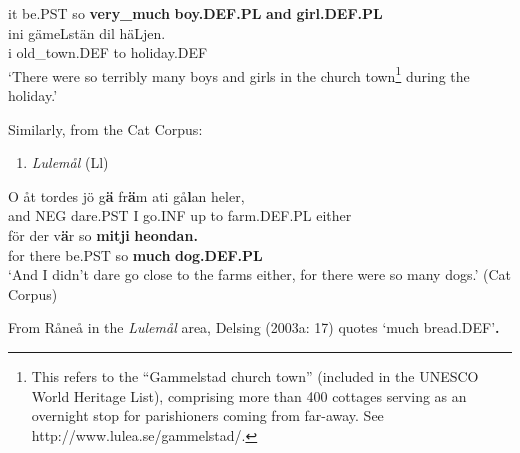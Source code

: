 it  be.PST  so  \textbf{very\_much} \textbf{boy.DEF.PL} \textbf{and} \textbf{girl.DEF.PL}\\ %


\ea\label{}
\gll ini  gämeLstän  dil  häLjen.\\


i  old\_town.DEF  to  holiday.DEF\\ %


‘There were so terribly many boys and girls in the church town\footnote{ This refers to the “Gammelstad church town” (included in the UNESCO World Heritage List), comprising more than 400 cottages serving as an overnight stop for parishioners coming from far-away. See http://www.lulea.se/gammelstad/.} during the holiday.’
\z

Similarly, from the Cat Corpus:

\begin{enumerate} %
\item 
\textit{Lulemål }(Ll) 
\end{enumerate} %
\ea\label{}
\gll O  åt  tordes  jö  g\textbf{ä}  fr\textbf{ä}m  ati  gå\textbf{l}an  heler,\\


and  NEG  dare.PST  I  go.INF  up  to  farm.DEF.PL  either\\ %


\ea\label{}
\gll för  der  v\textbf{ä}r  so  \textbf{mitji}\textbf{  heondan.}\\


for  there  be.PST  so  \textbf{much} \textbf{dog.DEF.PL}\\ %


‘And I didn’t dare go close to the farms either, for there were so many dogs.’ (Cat Corpus)
\z


From Råneå in the \textit{Lulemål} area, Delsing (2003a: 17) quotes\textbf{ } ‘much bread.DEF’\textbf{. }

